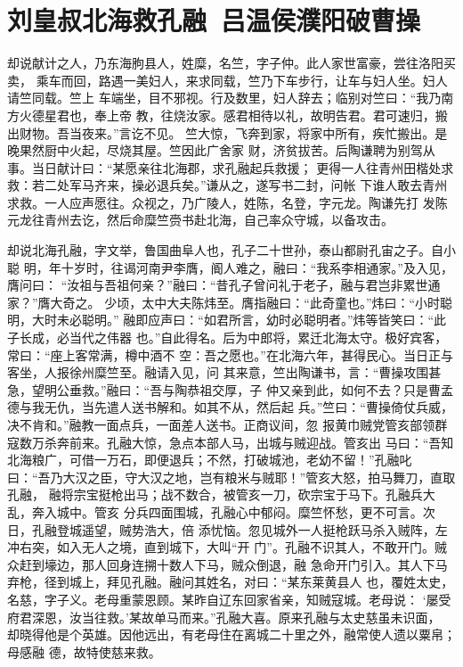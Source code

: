\chapter{刘皇叔北海救孔融~吕温侯濮阳破曹操}

却说献计之人，乃东海朐县人，姓糜，名竺，字子仲。此人家世富豪，尝往洛阳买卖，
乘车而回，路遇一美妇人，来求同载，竺乃下车步行，让车与妇人坐。妇人请竺同载。竺上
车端坐，目不邪视。行及数里，妇人辞去；临别对竺曰：“我乃南方火德星君也，奉上帝
教，往烧汝家。感君相待以礼，故明告君。君可速归，搬出财物。吾当夜来。”言讫不见。
竺大惊，飞奔到家，将家中所有，疾忙搬出。是晚果然厨中火起，尽烧其屋。竺因此广舍家
财，济贫拔苦。后陶谦聘为别驾从事。当日献计曰：“某愿亲往北海郡，求孔融起兵救援；
更得一人往青州田楷处求救：若二处军马齐来，操必退兵矣。”谦从之，遂写书二封，问帐
下谁人敢去青州求救。一人应声愿往。众视之，乃广陵人，姓陈，名登，字元龙。陶谦先打
发陈元龙往青州去讫，然后命糜竺赍书赴北海，自己率众守城，以备攻击。

却说北海孔融，字文举，鲁国曲阜人也，孔子二十世孙，泰山都尉孔宙之子。自小聪
明，年十岁时，往谒河南尹李膺，阍人难之，融曰：“我系李相通家。”及入见，膺问曰：
“汝祖与吾祖何亲？”融曰：“昔孔子曾问礼于老子，融与君岂非累世通家？”膺大奇之。
少顷，太中大夫陈炜至。膺指融曰：“此奇童也。”炜曰：“小时聪明，大时未必聪明。”
融即应声曰：“如君所言，幼时必聪明者。”炜等皆笑曰：“此子长成，必当代之伟器
也。”自此得名。后为中郎将，累迁北海太守。极好宾客，常曰：“座上客常满，樽中酒不
空：吾之愿也。”在北海六年，甚得民心。当日正与客坐，人报徐州糜竺至。融请入见，问
其来意，竺出陶谦书，言：“曹操攻围甚急，望明公垂救。”融曰：“吾与陶恭祖交厚，子
仲又亲到此，如何不去？只是曹孟德与我无仇，当先遣人送书解和。如其不从，然后起
兵。”竺曰：“曹操倚仗兵威，决不肯和。”融教一面点兵，一面差人送书。正商议间，忽
报黄巾贼党管亥部领群寇数万杀奔前来。孔融大惊，急点本部人马，出城与贼迎战。管亥出
马曰：“吾知北海粮广，可借一万石，即便退兵；不然，打破城池，老幼不留！”孔融叱
曰：“吾乃大汉之臣，守大汉之地，岂有粮米与贼耶！”管亥大怒，拍马舞刀，直取孔融，
融将宗宝挺枪出马；战不数合，被管亥一刀，砍宗宝于马下。孔融兵大乱，奔入城中。管亥
分兵四面围城，孔融心中郁闷。糜竺怀愁，更不可言。次日，孔融登城遥望，贼势浩大，倍
添忧恼。忽见城外一人挺枪跃马杀入贼阵，左冲右突，如入无人之境，直到城下，大叫“开
门”。孔融不识其人，不敢开门。贼众赶到壕边，那人回身连搠十数人下马，贼众倒退，融
急命开门引入。其人下马弃枪，径到城上，拜见孔融。融问其姓名，对曰：“某东莱黄县人
也，覆姓太史，名慈，字子义。老母重蒙恩顾。某昨自辽东回家省亲，知贼寇城。老母说：
‘屡受府君深恩，汝当往救。’某故单马而来。”孔融大喜。原来孔融与太史慈虽未识面，
却晓得他是个英雄。因他远出，有老母住在离城二十里之外，融常使人遗以粟帛；母感融
德，故特使慈来救。

